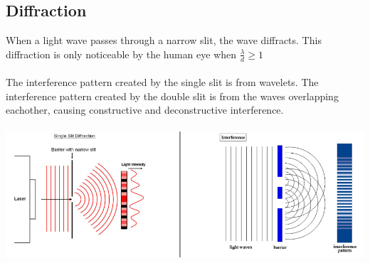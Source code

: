 \documentclass{article}
\begin{document}
\subsection{Diffraction}
When a light wave passes through a narrow slit, the wave diffracts. This diffraction is only noticeable by the human eye when $\frac{\lambda}{d} \geq 1$ \\\\
The interference pattern created by the single slit is from wavelets. The interference pattern created by the double slit is from the waves overlapping eachother, causing constructive and deconstructive interference. \\\\
\includegraphics[scale=0.4]{images/slit_diffraction} \\
\vspace{2cm}
\end{document}

